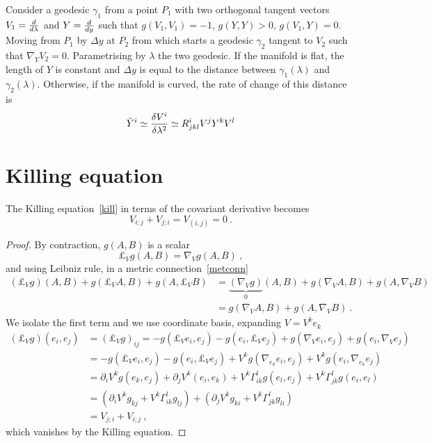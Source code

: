    Consider a geodesic $\gamma_1$ from a point $P_1$ with two orthogonal tangent vectors $V_1 = \frac{d}{d\lambda}$ and $Y = \frac{d}{dy}$ such that $g(V_1,V_1) = -1$, $g(Y, Y) > 0$, $g(V_1, Y) = 0$. Moving from $P_1$ by $\Delta y$ at $P_2$ from which starts a geodesic $\gamma_2$ tangent to $V_2$ such that $\nabla_Y V_2 = 0$. Parametrising by $\lambda$ the two geodesic. If the manifold is flat, the length of $Y$ is constant and $\Delta y$ is equal to the distance between $\gamma_1(\lambda)$ and $\gamma_2(\lambda)$. Otherwise, if the manifold is curved, the rate of change of this distance is 
    \begin{equation*}
        \ddot Y^i \simeq \frac{\delta V^i}{\delta \lambda^2} \simeq R^i_{jkl} V^j Y^k V^l
    \end{equation*}

\section{Killing equation}

    The Killing equation~\eqref{kill} in terms of the covariant derivative becomes 
    \begin{equation*}
        V_{i;j} + V_{j;i} = V_{(i,j)} = 0 ~.
    \end{equation*}

    \begin{proof}
        By contraction, $g(A,B)$ is a scalar
        \begin{equation*}
            \pounds_V g(A, B) = \nabla_V g(A,B) ~,
        \end{equation*}
        and using Leibniz rule, in a metric connection~\eqref{metconn}
        \begin{equation*}
        \begin{aligned}
            (\pounds_V g) (A, B) + g(\pounds_V A, B) + g(A, \pounds_V B) & = \underbrace{(\nabla_V g)}_0 (A, B) + g(\nabla_V A, B) + g(A, \nabla_V B) \\ & = g(\nabla_V A, B) + g(A, \nabla_V B) ~.
        \end{aligned}
        \end{equation*}
        We isolate the first term and we use coordinate basis, expanding $V = V^k e_k$
        \begin{equation*}
        \begin{aligned}
            (\pounds_V g) (e_i, e_j) & = (\pounds_V g)_{ij} = - g(\pounds_V e_i, e_j) - g(e_i, \pounds_V e_j) + g(\nabla_V e_i, e_j) + g(e_i, \nabla_V e_j) \\ & = - g(\pounds_V e_i, e_j) - g(e_i, \pounds_V e_j) + V^k g(\nabla_{e_k} e_i, e_j) + V^k g(e_i, \nabla_{e_k} e_j) \\ & = \partial_i V^k g(e_k, e_j) + \partial_j V^k (e_i, e_k) + V^k \Gamma^l_{ik} g(e_l, e_j) + V^k \Gamma^l_{jk} g(e_i, e_l) \\ & =(\partial_i V^k g_{kj} + V^k \Gamma^l_{ik} g_{lj}) + (\partial_j V^k g_{ki} + V^k \Gamma^l_{jk} g_{li}) \\ & = V_{j;i} + V_{i;j} ~,
        \end{aligned}
        \end{equation*}
        which vanishes by the Killing equation.
    \end{proof}

